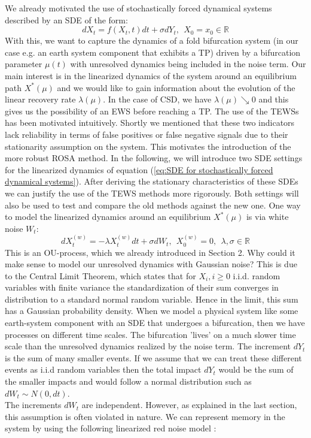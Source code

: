 \documentclass[%
thesis=student,%
coverpage=false,%
titlepage=false,%
headmarks=true, %
english,%
font=libertine, %
math=newpxtx, %
BCOR=5mm,%
coverBCOR=11mm%
]{tumbook}
\begin{document}
We already motivated the use of stochastically forced dynamical systems described by an SDE of the form:
\begin{equation}
    dX_{t} = f(X_{t},t)dt + \sigma dY_{t},\ \  X_{0} = x_{0} \in \mathbb{R}
    \label{eq:SDE for stochastically forced dynamical systems}
\end{equation}
With this, we want to capture the dynamics of a fold bifurcation system (in our case e.g. an earth system component that exhibits a TP) driven by a bifurcation parameter $\mu(t)$ with unresolved dynamics being included in the noise term. Our main interest is in the linearized dynamics of the system around an equilibrium path $X^{*}(\mu)$ and we would like to gain information about the evolution of the linear recovery rate $\lambda(\mu)$. In the case of CSD, we have $\lambda(\mu) \searrow 0$ and this gives us the possibility of an EWS before reaching a TP. The use of the TEWSs has been motivated intuitively. Shortly we mentioned that these two indicators lack reliability in terms of false positives or false negative signals due to their stationarity assumption on the system. This motivates the introduction of the more robust ROSA method. 
In the following, we will introduce two SDE settings for the linearized dynamics of equation (\ref{eq:SDE for stochastically forced dynamical systems}). 
After deriving the stationary characteristics of these SDEs we can justify the use of the TEWS methods more rigorously. Both settings will also be used to test and compare the old methods against the new one.
One way to model the linearized dynamics around an equilibrium $X^{*}(\mu)$ is via white noise $W_{t}$:
\begin{equation}
        dX_{t}^{(w)} = -\lambda X_{t}^{(w)}dt + \sigma dW_{t},\ \  X_{0}^{(w)} = 0, \ \ \lambda,\sigma \in \mathbb{R}
        \label{eq: white noise linearized SDE}
\end{equation}
This is an OU-process, which we already introduced in Section 2. Why could it make sense to model our unresolved dynamics with Gaussian noise? This is due to the Central Limit Theorem, which states that for $X_{i}, i \geq 0$ i.i.d. random variables with finite variance the standardization of their sum converges in distribution to a standard normal random variable. Hence in the limit, this sum has a Gaussian probability density. When we model a physical system like some earth-system component with an SDE that undergoes a bifurcation, then we have processes on different time scales. The bifurcation 'lives' on a much slower time scale than the unresolved dynamics realized by the noise term. The increment $dY_{t}$ is the sum of many smaller events. If we assume that we can treat these different events as i.i.d random variables then the total impact $dY_{t}$ would be the sum of the smaller impacts and would follow a normal distribution such as $dW_{t} \sim N(0,dt)$. \cite{Kurt:2010} \\
The increments $dW_{t}$ are independent. However, as explained in the last section, this assumption is often violated in nature. We can represent memory in the system by using the following linearized red noise model \cite{Hanggi:1994,Morr:2022}:
\end{document}
